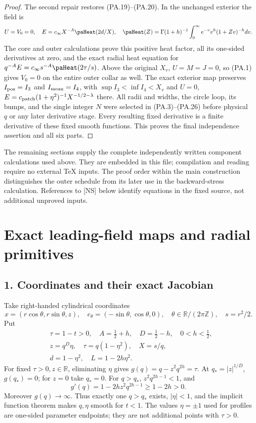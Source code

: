 \documentclass[10pt,a4paper]{article}
\begin{document}
\begin{proof}
The second repair restores (PA.19)--(PA.20). In the unchanged exterior the field is
\[
 U=V_0=0,\quad E=c_\infty X^{-A}\paHeat(2d/X),\quad
 \paHeat(Z)=\Gamma(1+h)^{-1}\int_0^\infty e^{-v}v^h(1+Zv)^{-h}dv.
\]
The core and outer calculations prove this positive heat factor, all its
one-sided derivatives at zero, and the exact radial heat equation for
$q^{-A}E=c_\infty s^{-A}\paHeat(2\tau/s)$. Above the original $X_v$,
$U=M=J=0$, so (PA.1) gives $V_0=0$ on the entire outer collar as well.
The exact exterior map preserves $I_{\rm pos}=I_3$ and $I_{\rm mean}=I_4$,
with $\sup I_3<\inf I_4<X_v$ and
$U=0$, $E=c_{\rm patch}(1+\eta^2)^{-1}X^{-1/2-\lambda}$ there.
All radii and widths, the circle loop, its bumps, and the single integer $N$
were selected in (PA.3)--(PA.26) before physical $q$ or any later derivative stage.
Every resulting fixed derivative is a finite derivative of these fixed smooth
functions. This proves the final independence assertion and all six parts.
\end{proof}

\medskip
\noindent The remaining sections supply the complete independently written component
calculations used above. They are embedded in this file; compilation and reading require
no external TeX inputs. The proof order within the main construction distinguishes the
outer schedule from its later use in the backward-stress calculation. References to [NS]
below identify equations in the fixed source, not additional unproved inputs.


\section{Exact leading-field maps and radial primitives}\label{pa:sec:component-core}

\subsection{1. Coordinates and their exact Jacobian}

Take right-handed cylindrical coordinates
\[
x=(r\cos\theta,r\sin\theta,z),\quad e_\theta=(-\sin\theta,\cos\theta,0),
\quad \theta\in\mathbb R/(2\pi\mathbb Z),\quad s=r^2/2.
\]
Put
\[
\begin{aligned}
&\tau=1-t>0,\quad A=\tfrac12+h,\quad D=\tfrac12-h,\quad 0<h<\tfrac12,\\
&z=q^D\eta,\quad \tau=q(1-\eta^2),\quad X=s/q,\\
&d=1-\eta^2,\quad L=1-2h\eta^2.
\end{aligned}
\]
For fixed \(\tau>0,z\in\mathbb R\), eliminating \(\eta\) gives
\(g(q)=q-z^2q^{2h}=\tau\). At \(q_*=|z|^{1/D}\), \(g(q_*)=0\); for \(z=0\) take \(q_*=0\). For \(q>q_*\), \(z^2q^{2h-1}<1\), and
\[
g'(q)=1-2hz^2q^{2h-1}\ge1-2h>0.
\]
Moreover \(g(q)\to\infty\). Thus exactly one \(q>q_*\) exists, \(|\eta|<1\), and the implicit function theorem makes \(q,\eta\) smooth for \(t<1\). The values \(\eta=\pm1\) used for profiles are one-sided parameter endpoints; they are not additional points with \(\tau>0\).
\end{document}
